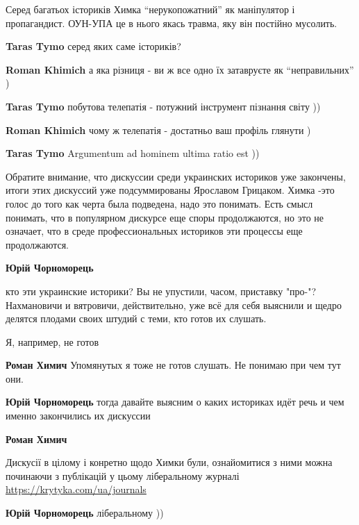 \begin{itemize}

Серед багатьох істориків Химка \enquote{нерукопожатний} як маніпулятор і пропагандист.
ОУН-УПА це в нього якась травма, яку він постійно мусолить.

\begin{itemize} %
\textbf{Taras Tymo} серед яких саме істориків?

\textbf{Roman Khimich} а яка різниця - ви ж все одно їх затавруєте як \enquote{неправильних} )

\textbf{Taras Tymo} побутова телепатія - потужний інструмент пізнання світу ))

\textbf{Roman Khimich} чому ж телепатія - достатньо ваш профіль глянути )

\textbf{Taras Tymo} Argumentum ad hominem ultima ratio est ))
\end{itemize} %


Обратите внимание, что дискуссии среди украинских историков уже закончены,
итоги этих дискуссий уже подсуммированы Ярославом Грицаком. Химка -это голос до
того как черта была подведена, надо это понимать. Есть смысл понимать, что в
популярном дискурсе еще споры продолжаются, но это не означает, что в среде
профессиональных историков эти процессы еще продолжаются.

\begin{itemize} %
\textbf{Юрій Чорноморець} 

кто эти украинские историки? Вы не упустили, часом, приставку "про-"?
Нахмановичи и вятровичи, действительно, уже всё для себя выяснили и щедро
делятся плодами своих штудий с теми, кто готов их слушать.

Я, например, не готов

\textbf{Роман Химич} Упомянутых я тоже не готов слушать. Не понимаю при чем тут они.

\textbf{Юрій Чорноморець} тогда давайте выясним о каких историках идёт речь и чем именно закончились их дискуссии

\textbf{Роман Химич} 

Дискусії в цілому і конретно щодо Химки були, ознайомитися з ними можна
починаючи з публікацій у цьому ліберальному журналі
\url{https://krytyka.com/ua/journals}

\textbf{Юрій Чорноморець} ліберальному ))


\end{itemize}
\end{itemize}
